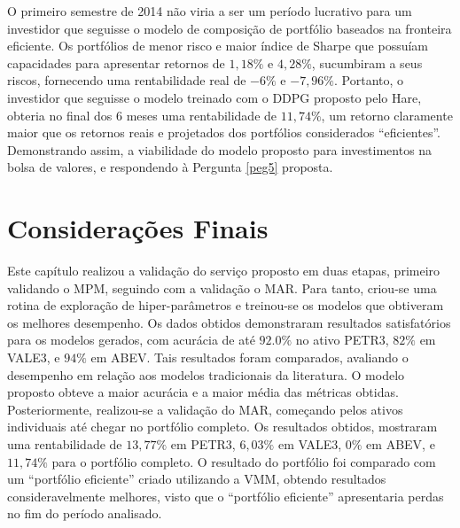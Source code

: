 

O primeiro semestre de 2014 não viria a ser um período lucrativo para um investidor que seguisse o modelo de composição de portfólio baseados na fronteira eficiente. Os portfólios de menor risco e maior índice de Sharpe que possuíam capacidades para apresentar retornos de $1,18\%$ e $4,28\%$, sucumbiram a seus riscos, fornecendo uma rentabilidade real de $-6\%$ e $-7,96\%$. Portanto, o investidor que seguisse o modelo treinado com o \acrshort{DDPG} proposto pelo Hare, obteria no final dos $6$ meses uma rentabilidade de $11,74\%$, um retorno claramente maior que os retornos reais e projetados dos portfólios considerados ``eficientes''. Demonstrando assim, a viabilidade do modelo proposto para investimentos na bolsa de valores, e respondendo à Pergunta \ref{peg5} proposta.

\section{Considerações Finais}
\label{exp:consideracoes}

Este capítulo realizou a validação do serviço proposto em duas etapas, primeiro validando o \acrshort{MPM}, seguindo com a validação o \acrshort{MAR}. Para tanto, criou-se uma rotina de exploração de hiper-parâmetros e treinou-se os modelos que obtiveram os melhores desempenho. Os dados obtidos demonstraram resultados satisfatórios para os modelos gerados, com acurácia de até $92.0\%$ no ativo PETR3, $82\%$ em VALE3, e $94\%$ em ABEV. Tais resultados foram comparados, avaliando o desempenho em relação aos modelos tradicionais da literatura. O modelo proposto obteve a maior acurácia e a maior média das métricas obtidas. Posteriormente, realizou-se a validação do \acrshort{MAR}, começando pelos ativos individuais até chegar no portfólio completo. Os resultados obtidos, mostraram uma rentabilidade de $13,77\%$ em PETR3, $6,03\%$ em VALE3, $0\%$ em ABEV, e $11,74\%$ para o portfólio completo. O resultado do portfólio foi comparado com um ``portfólio eficiente'' criado utilizando a \acrshort{VMM}, obtendo resultados consideravelmente melhores, visto que o ``portfólio eficiente'' apresentaria perdas no fim do período analisado.
 
